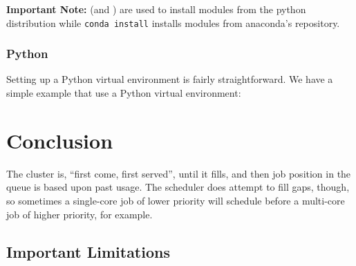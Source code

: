 \documentclass{easychair}
\begin{document}
\vspace{10pt}
\noindent
\textbf{Important Note:}  (and ) are used to install modules
 from the python distribution while \texttt{conda install} installs modules from 
 anaconda's repository.
\vspace{10pt}

\subsubsection{Python}
\label{sect:python-venv}

Setting up a Python virtual environment is fairly straightforward.
We have a simple example that use a Python virtual environment:




\section{Conclusion}
\label{sect:conclusion}

The cluster is, ``first come, first served'', until it fills, and then job
position in the queue is based upon past usage. The scheduler does attempt
to fill gaps, though, so sometimes a single-core job of lower priority
will schedule before a multi-core job of higher priority, for example.

\subsection{Important Limitations}
\label{sect:limitations}
\end{document}
